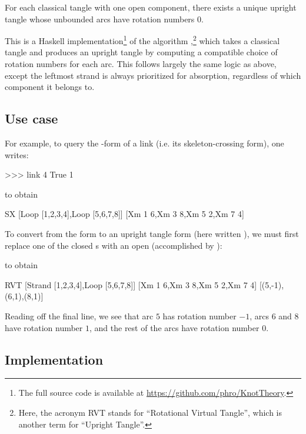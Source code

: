 \begin{lemma}
        For each classical tangle with one open component, there exists a unique
        upright tangle whose unbounded arcs have rotation numbers $0$.
\end{lemma}

This is a Haskell implementation\footnote{The full source code is available at
\url{https://github.com/phro/KnotTheory}.} of the algorithm ,\footnote{Here, the
acronym RVT stands for \enquote{Rotational Virtual Tangle}, which is
another term for \enquote{Upright Tangle}.} which takes a classical tangle and
produces an upright tangle by computing a compatible choice of rotation numbers
for each arc. This follows largely the same logic as above, except the leftmost
strand is always prioritized for absorption, regardless of which component it
belongs to.

\subsection{Use case}

For example, to query the -form of a link (i.e. its skeleton-crossing
form), one writes:
\begin{code}
>>> link 4 True 1
\end{code}
to obtain
\begin{code}
SX [Loop [1,2,3,4],Loop [5,6,7,8]]
   [Xm 1 6,Xm 3 8,Xm 5 2,Xm 7 4]
\end{code}
To convert from the  form to an upright tangle form (here written
), we must first replace one of the closed s with an open
 (accomplished by ):
to obtain
\begin{code}
RVT [Strand [1,2,3,4],Loop [5,6,7,8]]
    [Xm 1 6,Xm 3 8,Xm 5 2,Xm 7 4]
    [(5,-1),(6,1),(8,1)]
\end{code}
Reading off the final line, we see that arc $5$ has rotation number $-1$, arcs
$6$ and $8$ have rotation number $1$, and the rest of the arcs have rotation
number $0$.

\subsection{Implementation}


